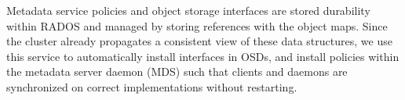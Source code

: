 Metadata service policies and object
storage interfaces are stored durability within RADOS and managed by storing
references with the object maps. Since the cluster already propagates a
consistent view of these data structures, we use this service to automatically
install interfaces in OSDs, and install policies within the metadata server
daemon (MDS) such that clients and daemons are synchronized on
correct implementations without restarting.

 
